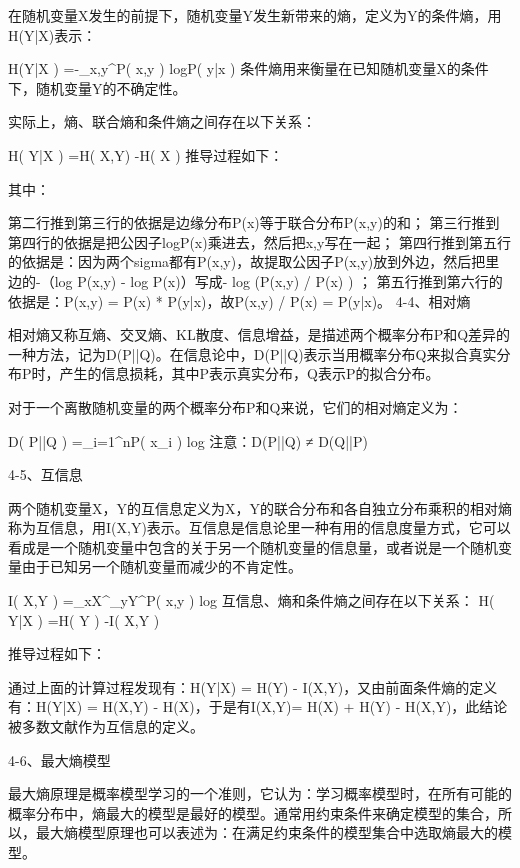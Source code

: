 \documentclass[11pt]{book}
\newcounter{#2}
\newcounter{#2}[#1]
\numberwithin{#2}{#1}
\begin{document}
在随机变量X发生的前提下，随机变量Y发生新带来的熵，定义为Y的条件熵，用H(Y|X)表示：

H\left(Y|X \right) =-\sum_{x,y}^{}{P\left( x,y \right) logP\left( y|x \right) } 
条件熵用来衡量在已知随机变量X的条件下，随机变量Y的不确定性。

实际上，熵、联合熵和条件熵之间存在以下关系：

H\left( Y|X \right) =H\left( X,Y\right) -H\left( X \right) 
推导过程如下：

其中：

第二行推到第三行的依据是边缘分布P(x)等于联合分布P(x,y)的和；
第三行推到第四行的依据是把公因子logP(x)乘进去，然后把x,y写在一起；
第四行推到第五行的依据是：因为两个sigma都有P(x,y)，故提取公因子P(x,y)放到外边，然后把里边的-（log P(x,y) - log P(x)）写成- log (P(x,y) / P(x) ) ；
第五行推到第六行的依据是：P(x,y) = P(x) * P(y|x)，故P(x,y) / P(x) = P(y|x)。
4-4、相对熵

相对熵又称互熵、交叉熵、KL散度、信息增益，是描述两个概率分布P和Q差异的一种方法，记为D(P||Q)。在信息论中，D(P||Q)表示当用概率分布Q来拟合真实分布P时，产生的信息损耗，其中P表示真实分布，Q表示P的拟合分布。

对于一个离散随机变量的两个概率分布P和Q来说，它们的相对熵定义为：

D\left( P||Q \right) =\sum_{i=1}^{n}{P\left( x_{i}  \right) log } 
注意：D(P||Q) ≠ D(Q||P)

4-5、互信息

两个随机变量X，Y的互信息定义为X，Y的联合分布和各自独立分布乘积的相对熵称为互信息，用I(X,Y)表示。互信息是信息论里一种有用的信息度量方式，它可以看成是一个随机变量中包含的关于另一个随机变量的信息量，或者说是一个随机变量由于已知另一个随机变量而减少的不肯定性。

I\left( X,Y \right) =\sum_{x\in X}^{}{\sum_{y\in Y}^{}{P\left( x,y \right) } log } 
互信息、熵和条件熵之间存在以下关系： H\left( Y|X \right) =H\left( Y \right) -I\left( X,Y \right) 

推导过程如下：

通过上面的计算过程发现有：H(Y|X) = H(Y) - I(X,Y)，又由前面条件熵的定义有：H(Y|X) = H(X,Y) - H(X)，于是有I(X,Y)= H(X) + H(Y) - H(X,Y)，此结论被多数文献作为互信息的定义。

4-6、最大熵模型

最大熵原理是概率模型学习的一个准则，它认为：学习概率模型时，在所有可能的概率分布中，熵最大的模型是最好的模型。通常用约束条件来确定模型的集合，所以，最大熵模型原理也可以表述为：在满足约束条件的模型集合中选取熵最大的模型。
\end{document}

